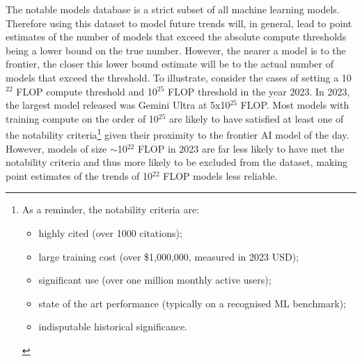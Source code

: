 \documentclass[11pt]{article}
\begin{document}
The notable models database is a strict subset of all machine learning models. Therefore using this dataset to model future trends will, in general, lead to point estimates of the number of models that exceed the absolute compute thresholds being a lower bound on the true number\textit{.} However, the nearer a model is to the frontier, the closer this lower bound estimate will be to the actual number of models that exceed the threshold. To illustrate, consider the cases of setting a 10$^{22}$ FLOP compute threshold and 10$^{25}$ FLOP threshold in the year 2023. In 2023, the largest model released was Gemini Ultra at 5x10$^{25}$ FLOP. Most models with training compute on the order of 10$^{25}$ are likely to have satisfied at least one of the notability criteria\footnote{As a reminder, the notability criteria are:
\begin{itemize}
\item highly cited (over 1000 citations);
\item large training cost (over \$1,000,000, measured in 2023 USD);
\item significant use (over one million monthly active users);
\item state of the art performance (typically on a recognised ML benchmark);
\item indisputable historical significance.
\end{itemize}} given their proximity to the frontier AI model of the day. However, models of size $\sim$10$^{22}$ FLOP in 2023 are far less likely to have met the notability criteria and thus more likely to be excluded from the dataset, making point estimates of the trends of 10$^{22}$ FLOP models less reliable.
\end{document}
